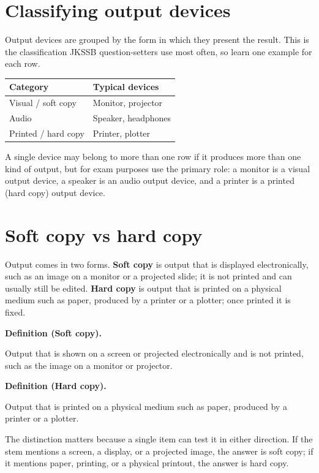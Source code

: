 \documentclass[11pt]{article}
\newenvironment{definitionbox}[1]{%
  \par\noindent\textbf{Definition (#1).}\ \itshape
}{\par\vspace{0.3em}}
\begin{document}
\section{Classifying output devices}
Output devices are grouped by the form in which they present the result. This
is the classification JKSSB question-setters use most often, so learn one
example for each row.

\begin{center}
\begin{tabular}{p{}p{}}
\toprule
\textbf{Category} & \textbf{Typical devices} \\
\midrule
Visual / soft copy & Monitor, projector \\
Audio & Speaker, headphones \\
Printed / hard copy & Printer, plotter \\
\bottomrule
\end{tabular}
\end{center}

A single device may belong to more than one row if it produces more than one
kind of output, but for exam purposes use the primary role: a monitor is a
visual output device, a speaker is an audio output device, and a printer is a
printed (hard copy) output device.

\section{Soft copy vs hard copy}
Output comes in two forms. \textbf{Soft copy} is output that is displayed
electronically, such as an image on a monitor or a projected slide; it is not
printed and can usually still be edited. \textbf{Hard copy} is output that is
printed on a physical medium such as paper, produced by a printer or a
plotter; once printed it is fixed.

\begin{definitionbox}{Soft copy}
Output that is shown on a screen or projected electronically and is not
printed, such as the image on a monitor or projector.
\end{definitionbox}

\begin{definitionbox}{Hard copy}
Output that is printed on a physical medium such as paper, produced by a
printer or a plotter.
\end{definitionbox}

The distinction matters because a single item can test it in either
direction. If the stem mentions a screen, a display, or a projected image,
the answer is soft copy; if it mentions paper, printing, or a physical
printout, the answer is hard copy.
\end{document}
